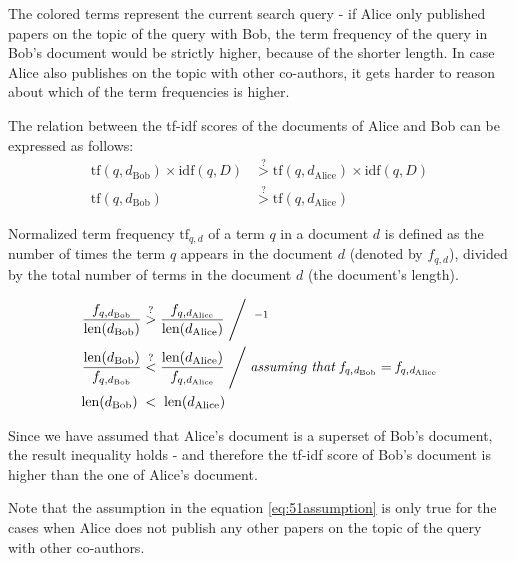 The colored terms represent the current search query - if Alice only published papers on the topic of the query with Bob, the term frequency of the 
query in Bob's document would be strictly higher, because of the shorter length.
In case Alice also publishes on the topic with other co-authors, it gets harder to reason about which of the term frequencies is higher.

The relation between the tf-idf scores of the documents of Alice and Bob can be expressed as follows:
\begin{subequations}
\begin{align}
\text{tf}(q, d_{\text{Bob}}) \times \text{idf}(q, D) &\stackrel{?}{>} \text{tf}(q, d_{\text{Alice}}) \times \text{idf}(q, D) \\
\text{tf}(q, d_{\text{Bob}}) &\stackrel{?}{>} \text{tf}(q, d_{\text{Alice}})
\end{align}
\end{subequations}

Normalized term frequency $\text{tf}_{q,d}$ of a term $q$ in a document $d$ is defined as the number of times the term $q$ appears in the document $d$ (denoted by $f_{q,d}$),
divided by the total number of terms in the document $d$ (the document's length).

\begin{subequations}
\begin{align}
\frac{f_{q, d_{\text{Bob}}}}{\text{len}(d_{\text{Bob}})} &\stackrel{?}{>} \frac{f_{q, d_{\text{Alice}}}}{\text{len}(d_{\text{Alice}})} \Biggm/ \;^{-1} \\
\frac{\text{len}(d_{\text{Bob}})}{f_{q, d_{\text{Bob}}}} &\stackrel{?}{<} \frac{\text{len}(d_{\text{Alice}})}{f_{q, d_{\text{Alice}}}} \Biggm/ \textit{assuming that } \mathit{f_{q, d_{\text{Bob}}} = f_{q, d_{\text{Alice}}}} \label{eq:51assumption}\\
\text{len}(d_{\text{Bob}}) \;&<\;\text{len}(d_{\text{Alice}})
\end{align}
\end{subequations}

Since we have assumed that Alice's document is a superset of Bob's document, the result inequality holds - and therefore the tf-idf score of Bob's document is higher than the one of Alice's document.

Note that the assumption in the equation \ref{eq:51assumption} is only true for the cases when Alice does not publish any other papers on the topic of the query with other co-authors.


